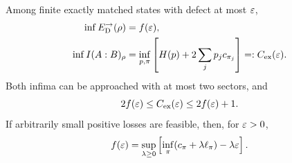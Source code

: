 \begin{theorem}\label{thm:sectors}
Among finite exactly matched states with defect at most $\varepsilon$,
\begin{align}
 \inf E_{\mathrm D}^{\to}(\rho)&=f(\varepsilon),\label{eq:sectored}\\
 \inf I(A:B)_\rho&=\inf_{p,\pi}\left[H(p)+2\sum_jp_jc_{\pi_j}\right]=:C_{\rm ex}(\varepsilon).
 \label{eq:sectormi}
\end{align}
Both infima can be approached with at most two sectors, and
\begin{equation}
 2f(\varepsilon)\le C_{\rm ex}(\varepsilon)\le2f(\varepsilon)+1.\label{eq:sectorbounds}
\end{equation}
If arbitrarily small positive losses are feasible, then, for $\varepsilon>0$,
\begin{equation}
 f(\varepsilon)=\sup_{\lambda\ge0}\left[
       \inf_\pi(c_\pi+\lambda\ell_\pi)-\lambda\varepsilon\right].\label{eq:sectordual}
\end{equation}
\end{theorem}
